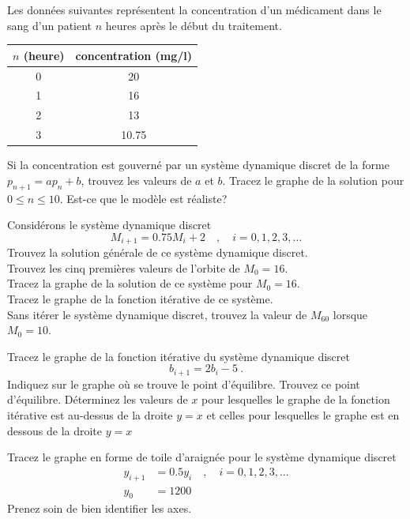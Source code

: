 \begin{question}[\life]
Les données suivantes représentent la concentration d'un médicament dans le
sang d'un patient $n$ heures après le début du traitement.
\begin{center}
\begin{tabular}{c|c}
$n$ (heure) & concentration (mg/l) \\
\hline
0 & 20 \\
1 & 16 \\
2 & 13 \\
3 & 10.75
\end{tabular}
\end{center}
Si la concentration est gouverné par un système dynamique discret de
la forme $p_{n+1} = a p_n + b$, trouvez les valeurs de $a$ et $b$.  Tracez le
graphe de la solution pour $0 \leq n \leq 10$.  Est-ce que le modèle est
réaliste?
\label{6Q79}
\end{question}

\begin{question}[\life]
Considérons le système dynamique discret
\begin{equation}\label{sdd18}
M_{i+1} = 0.75 M_i + 2  \quad , \quad i=0, 1, 2, 3, \ldots
\end{equation}
 Trouvez la solution générale de ce système dynamique discret.\\
 Trouvez les cinq premières valeurs de l'orbite de $M_0 = 16$.\\
 Tracez la graphe de la solution de ce système pour $M_0 = 16$.\\
 Tracez le graphe de la fonction itérative de ce système.\\
 Sans itérer le système dynamique discret, trouvez la valeur
de $M_{60}$ lorsque $M_0 = 10$.
\label{6Q80}
\end{question}

\begin{question}[\life]
Tracez le graphe de la fonction itérative du système dynamique
discret
\[
b_{i+1} = 2 b_i - 5  \ .
\]
Indiquez sur le graphe où se trouve le point d'équilibre.  Trouvez ce
point d'équilibre.  Déterminez les valeurs de $x$ pour lesquelles le 
graphe de la fonction itérative est au-dessus de la droite $y=x$ et
celles pour lesquelles le graphe est en dessous de la droite $y=x$
\label{6Q81}
\end{question}

\begin{question}[\life]
Tracez le graphe en forme de toile d'araignée pour le système
dynamique discret
\begin{align*}
y_{i+1} &= 0.5 y_i \quad , \quad i=0, 1, 2, 3, \ldots \\
y_0 &= 1200
\end{align*}
Prenez soin de bien identifier les axes.
\label{6Q82}
\end{question}

